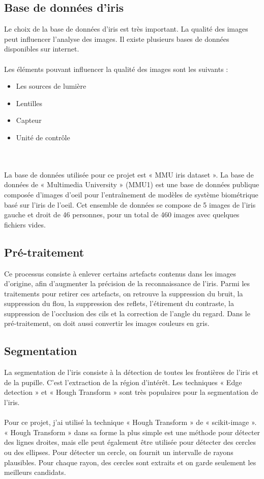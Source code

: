 \documentclass[12pt,twoside,letterpaper]{article}
\begin{document}
\subsection{Base de données d’iris}
Le choix de la base de données d’iris est très important. La qualité des images peut influencer l’analyse des images. Il existe plusieurs bases de données disponibles sur internet.
\\~\\
Les éléments pouvant influencer la qualité des images sont les suivants :
\begin{itemize}
    \item Les sources de lumière
    \item Lentilles
    \item Capteur
    \item Unité de contrôle
\end{itemize}
\cite{ref_01}\cite{ref_06}
\ \\~\\
La base de données utilisée pour ce projet est « MMU iris dataset ». La base de données de « Multimedia University » (MMU1) est une base de données publique composée d'images d'oeil pour l'entraînement de modèles de système biométrique basé sur l'iris de l'oeil. Cet ensemble de données se compose de 5 images de l'iris gauche et droit de 46 personnes, pour un total de 460 images avec quelques fichiers vides.\cite{ref_05}

\subsection{Pré-traitement}
Ce processus consiste à enlever certains artefacts contenus dans les images d’origine, afin d’augmenter la précision de la reconnaissance de l’iris. Parmi les traitements pour retirer ces artefacts, on retrouve la suppression du bruit, la suppression du flou, la suppression des reflets, l’étirement du contraste, la suppression de l’occlusion des cils et la correction de l'angle du regard. Dans le pré-traitement, on doit aussi convertir les images couleurs en gris.\cite{ref_01}\cite{ref_06}


\subsection{Segmentation}
La segmentation de l’iris consiste à la détection de toutes les frontières de l’iris et de la pupille. C’est l’extraction de la région d’intérêt. Les techniques « Edge detection » et « Hough Transform » sont très populaires pour la segmentation de l’iris. 
\\~\\
Pour ce projet, j'ai utilisé la technique « Hough Transform » de « scikit-image ». « Hough Transform » dans sa forme la plus simple est une méthode pour détecter des lignes droites, mais elle peut également être utilisée pour détecter des cercles ou des ellipses. Pour détecter un cercle, on fournit un intervalle de rayons plausibles. Pour chaque rayon, des cercles sont extraits et on garde seulement les meilleurs candidats.\cite{ref_04}
\end{document}
